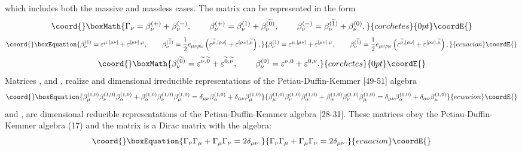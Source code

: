 \documentclass[a4paper,12pt]{article}
\begin{document}
which includes both the massive and massless cases. The \coordHE{}matrix
\myHighlight{$\Gamma _\nu $}\coordHE{} can be represented in the form
\[\coord{}\boxMath{
\Gamma _\nu =\beta _\nu ^{(+)}+\beta _\nu ^{(-)} ,
\hspace{0.3in}\beta _\nu ^{(+)}=\beta _\nu ^{(1)}+\beta _\nu
^{(\widetilde{0})} ,\hspace{0.3in}\beta _\nu ^{(-)}=\beta _\nu
^{(\widetilde{1})}+\beta _\nu ^{(0)} ,
}{corchetes}{0pt}\coordE{}\]
\begin{equation}\coord{}\boxEquation{
\beta _\nu ^{(1)}=\varepsilon ^{\mu ,[\mu \nu ]}+\varepsilon
^{[\mu \nu ],\mu } ,\hspace{0.3in}\beta _\nu
^{(\widetilde{1})}=\frac 12e_{\mu \nu \rho \omega }\left(
\varepsilon ^{\widetilde{\mu },[\rho \omega ]}+\varepsilon ^{[\rho
\omega ],\widetilde{\mu }}\right) , \label{16}
}{
\beta _\nu ^{(1)}=\varepsilon ^{\mu ,[\mu \nu ]}+\varepsilon
^{[\mu \nu ],\mu } ,\hspace{0.3in}\beta _\nu
^{(\widetilde{1})}=\frac 12e_{\mu \nu \rho \omega }\left(
\varepsilon ^{\widetilde{\mu },[\rho \omega ]}+\varepsilon ^{[\rho
\omega ],\widetilde{\mu }}\right) , }{ecuacion}\coordE{}\end{equation}
\[\coord{}\boxMath{
\beta _\nu ^{(\widetilde{0})}=\varepsilon ^{\widetilde{\nu
},\widetilde{0} }+\varepsilon ^{\widetilde{0},\widetilde{\nu }} ,
\hspace{0.3in}\beta _\nu ^{(0)}=\varepsilon ^{\nu ,0}+\varepsilon
^{0,\nu } .
}{corchetes}{0pt}\coordE{}\]
Matrices \coordHE{}, \coordHE{} and
\coordHE{}, \coordHE{} realize \coordHE{}
and \coordHE{} dimensional irreducible representations of the
Petiau-Duffin-Kemmer [49-51] algebra
\begin{equation}\coord{}\boxEquation{
\beta _\mu ^{(1,0)}\beta _\nu ^{(1,0)}\beta _\alpha ^{(1,0)}+\beta _\alpha
^{(1,0)}\beta _\nu ^{(1,0)}\beta _\mu ^{(1,0)}=\delta _{\mu \nu }\beta
_\alpha ^{(1,0)}+\delta _{\alpha \nu }\beta _\mu ^{(1,0)}  \label{17}
}{
\beta _\mu ^{(1,0)}\beta _\nu ^{(1,0)}\beta _\alpha ^{(1,0)}+\beta _\alpha
^{(1,0)}\beta _\nu ^{(1,0)}\beta _\mu ^{(1,0)}=\delta _{\mu \nu }\beta
_\alpha ^{(1,0)}+\delta _{\alpha \nu }\beta _\mu ^{(1,0)}  }{ecuacion}\coordE{}\end{equation}
and \myHighlight{$\beta _\nu ^{(+)}$}\coordHE{}, \myHighlight{$\beta _\nu ^{(-)}$}\coordHE{} are \coordHE{}dimensional reducible
representations of the Petiau-Duffin-Kemmer algebra [28-31]. These matrices
obey the Petiau-Duffin-Kemmer algebra (17) and the matrix \myHighlight{$\Gamma _\nu $}\coordHE{} is
a \coordHE{}Dirac matrix with the algebra:
\begin{equation}\coord{}\boxEquation{
\Gamma _\nu \Gamma _\mu +\Gamma _\mu \Gamma _\nu =2\delta _{\mu
\nu } .\label{18}
}{
\Gamma _\nu \Gamma _\mu +\Gamma _\mu \Gamma _\nu =2\delta _{\mu
\nu } .}{ecuacion}\coordE{}\end{equation}
\end{document}
